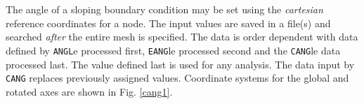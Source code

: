  \\{\smallskip}
 \\{\smallskip}
 \\{\smallskip}
 \\{\smallskip}
 \\{\smallskip}
 \\{\smallskip}
 \\{\smallskip}
 \\{\smallskip}
 \\{\smallskip}
 \\{\smallskip}
 \\{\smallskip}
 \\{\smallskip}
 \\{\smallskip}
 \\{\smallskip}
 \\{\smallskip}
 \\{\smallskip}
 \\{\smallskip}
\headb

The angle of a sloping boundary condition may be set
using the {\it cartesian} reference coordinates for a node.
The input values are saved in a file(s) and searched
\textit{after} the entire mesh is specified.
The data is order dependent with data
defined by {\tt ANGL}e processed first, {\tt EANG}le processed second and
the {\tt CANG}le data processed last.  The value defined last is used for
any analysis.
The data input by {\tt CANG} replaces previously assigned values.
Coordinate systems for the global and rotated axes are shown in Fig.
\ref{cang1}.

